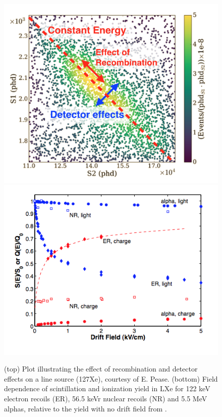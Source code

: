\begin{figure}[htbp]
\begin{center}
\includegraphics[width=\textwidth]{figures/lxetpcs/recombination.png} \\
\includegraphics[width=\textwidth]{figures/lxetpcs/yields.png}
\caption{(top) Plot illustrating the effect of recombination and detector effects on a line source (127Xe), courtesy of E. Pease. (bottom) Field dependence of scintillation and ionization yield in LXe for 122 keV electron recoils (ER), 56.5 keVr nuclear recoils (NR) and 5.5 MeV alphas, relative to the yield with no drift field from \cite{Aprile2010}.}
\label{fig:recombination}
\end{center}
\end{figure}

